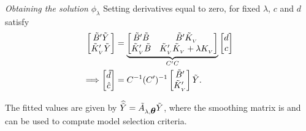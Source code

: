 \begin{frame}{\textit{Obtaining the solution}  $\phi_\lambda$}
\footnotesize
Setting derivatives equal to zero, for fixed $\lambda$, $c$ and $d$ satisfy
\begin{align*}%
\begin{bmatrix}
\tildeB'\tildeY \\
 \tildeK_{_{ V}}'\tildeY\\
\end{bmatrix} &= \underbrace{\begin{bmatrix}
\tildeB'\tildeB & \tildeB'\tildeK_{_{ V}} \\
\tildeK_{_{ V}}'\tildeB & \tildeK_{_{ V}}'\tildeK_{_{ V}} + \lambda K_{_{ V}}\\
\end{bmatrix}}_{C'C}
\begin{bmatrix}
d\\
c\\
\end{bmatrix}
\\
\Longrightarrow \begin{bmatrix} \hat{d} \\ \hat{c} \end{bmatrix} &=  {C}^{-1} ({C}')^{-1} \begin{bmatrix} \tildeB' \\ \tildeK_{_{ V}}' \end{bmatrix} \tildeY. 
\end{align*}

The fitted values are given by $\widehat{\tilde{Y}} =  \tilde{A}_{\lambda,\mbox{\boldmath $\theta$}} \tilde{Y}$, where the smoothing matrix is
and can be used to compute model selection criteria.
\end{frame}


